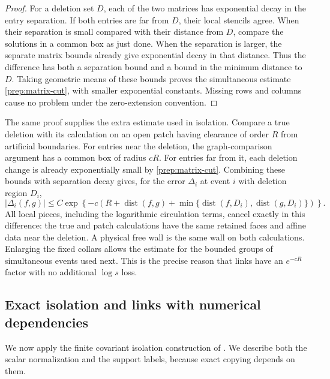 \begin{proof}
For a deletion set $D$, each of the two matrices has exponential decay
in the entry separation.  If both entries are far from $D$, their local
stencils agree.  When their separation is small compared with their
distance from $D$, compare the solutions in a common box as just done.
When the separation is larger, the separate matrix bounds already give
exponential decay in that distance.  Thus the difference has both a
separation bound and a bound in the minimum distance to $D$.  Taking
geometric means of these bounds proves the simultaneous estimate
\eqref{prep:matrix-cut}, with smaller exponential constants.  Missing
rows and columns cause no problem under the zero-extension convention.
\end{proof}

The same proof supplies the extra estimate used in isolation.  Compare
a true deletion with its calculation on an open patch having clearance
of order $R$ from artificial boundaries.  For entries near the deletion,
the graph-comparison argument has a common box of radius $cR$.  For
entries far from it, each deletion change is already exponentially
small by \eqref{prep:matrix-cut}.  Combining these bounds with separation
decay gives, for the error $\Delta_i$ at event $i$ with deletion region
$D_i$,
\begin{equation}\label{prep:event-mismatch}
 |\Delta_i(f,g)|\le
 C\exp\left\{-c\left(R+\operatorname{dist}(f,g)
       +\min\{\operatorname{dist}(f,D_i),\operatorname{dist}(g,D_i)\}
                                                        \right)\right\}.
\end{equation}
All local pieces, including the logarithmic circulation terms, cancel
exactly in this difference: the true and patch calculations have the
same retained faces and affine data near the deletion.  A physical free
wall is the same wall on both calculations.  Enlarging the fixed collars
allows the estimate for the bounded groups of simultaneous events used
next.  This is the precise reason that links have an $e^{-cR}$ factor
with no additional $\log s$ loss.

\subsection{Exact isolation and links with numerical dependencies}
\label{prep:isolation}

We now apply the finite covariant isolation construction of
\cite[Subsection 9.2]{B}.  We describe both the scalar
normalization and the support labels, because exact copying depends on
them.


